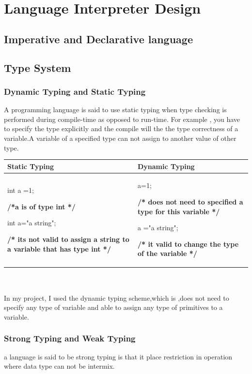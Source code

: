 \chapter{Language Interpreter Design}


\section{Imperative and Declarative language}




\section{Type System}
\subsection{Dynamic Typing and Static Typing}
A programming language is said to use static typing when type checking is performed during compile-time as opposed to run-time. 
For example , you have to specify the type explicitly and the compile will the the type correctness of a variable.A variable of a specified type can not assign to another value of other type.

\begin{tabular}{p{5cm}|p{5cm}}
\hline
Static Typing & Dynamic Typing \\
\hline
int a =1;\par \textbf{/*a is of type int */} \par int a="a string"; \par \textbf{ /* its not valid to assign a string to a variable that has type int */} & a=1; \par \textbf{/* does not need to specified a type for this variable */} \par a ="a string"; \par
\textbf{/* it valid to change the type of the variable */} \\ 
\hline
\end{tabular} \\\\
In my project, I used the dynamic typing scheme,which is ,does not need to specify any type of variable and able to assign any type of primitives to a variable.

\subsection{Strong Typing and Weak Typing}
a language is said to be strong typing is that it place restriction in operation where data type can not be intermix.



